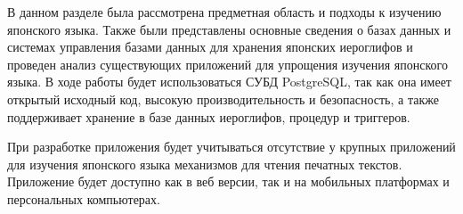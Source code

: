 В данном разделе была рассмотрена предметная область и подходы
к изучению японского языка. Также были представлены основные сведения
о базах данных и системах управления базами данных для хранения
японских иероглифов и проведен анализ существующих приложений
для упрощения изучения японского языка. В ходе работы будет использоваться СУБД PostgreSQL, так как она имеет открытый исходный код, высокую производительность и безопасность, а также поддерживает хранение в базе данных иероглифов, процедур и триггеров.

При разработке приложения будет учитываться отсутствие у крупных приложений для изучения японского языка механизмов для чтения печатных текстов. Приложение будет доступно как в веб версии, так и на мобильных платформах и персональных компьютерах.
